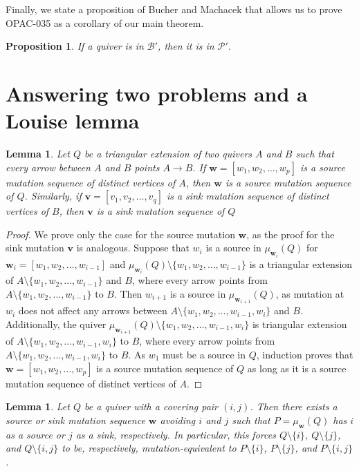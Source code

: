 \documentclass[10pt]{amsart}
\newtheorem{lemm}[thm]{Lemma}
\newtheorem{prop}[thm]{Proposition}
\theoremstyle{definition}
\theoremstyle{remark}
\newcommand{\BB}{\mathcal{B}}
\newcommand{\PP}{\mathcal{P}}
\newcommand{\bw}{{\boldsymbol{w}}}
\newcommand{\bv}{{\boldsymbol{v}}}
\begin{document}
Finally, we state a proposition of Bucher and Machacek that allows us to prove OPAC-035 as a corollary of our main theorem.

\begin{prop}{\cite[Proposition 3.4]{MR4108215}} \label{prop-banff-p-containment}
    If a quiver is in $\BB'$, then it is in $\PP'$.
\end{prop}

\section{Answering two problems and a Louise lemma}\label{sec-proof}

\begin{lemm} \label{lem-triangular-extension-source-sink}
    Let $Q$ be a triangular extension of two quivers $A$ and $B$ such that every arrow between $A$ and $B$ points $A \to B$.
    If $\bw = [w_1, w_2, \dots, w_p]$ is a source mutation sequence of distinct vertices of $A$, then $\bw$ is a source mutation sequence of $Q$.
    Similarly, if $\bv = [v_1, v_2, \dots, v_q]$ is a sink mutation sequence of distinct vertices of $B$, then $\bv$ is a sink mutation sequence of $Q$
\end{lemm}

\begin{proof}
    We prove only the case for the source mutation $\bw$, as the proof for the sink mutation $\bv$ is analogous. 
    Suppose that $w_i$ is a source in $\mu_{\bw_i}(Q)$ for $\bw_i = [w_1, w_2, \dots, w_{i-1}]$ and $\mu_{\bw_i}(Q) \setminus \{w_1,w_2,\dots, w_{i-1}\}$ is a triangular extension of $A \setminus \{w_1,w_2,\dots, w_{i-1}\}$ and $B$, where every arrow points from $A \setminus \{w_1,w_2,\dots, w_{i-1}\}$ to $B$.
    Then $w_{i+1}$ is a source in $\mu_{\bw_{i+1}}(Q)$, as mutation at $w_i$ does not affect any arrows between $A \setminus \{w_1,w_2,\dots, w_{i-1}, w_i\}$ and $B$.
    Additionally, the quiver $\mu_{\bw_{i+1}}(Q) \setminus \{w_1,w_2,\dots, w_{i-1}, w_i\}$ is triangular extension of $A \setminus \{w_1,w_2,\dots, w_{i-1}, w_i\}$ to $B$, where every arrow points from $A \setminus \{w_1,w_2,\dots, w_{i-1}, w_i\}$ to $B$.
    As $w_1$ must be a source in $Q$, induction proves that $\bw = [w_1, w_2, \dots, w_p]$ is a source mutation sequence of $Q$ as long as it is a source mutation sequence of distinct vertices of $A$.
\end{proof}

\begin{lemm} \label{lem-covering-pair-mutation}
    Let $Q$ be a quiver with a covering pair $(i,j)$.
    Then there exists a source or sink mutation sequence $\bw$ avoiding $i$ and $j$ such that $P = \mu_\bw(Q)$ has $i$ as a source or $j$ as a sink, respectively.
    In particular, this forces $Q \setminus \{i\}$, $Q \setminus \{j\}$, and $Q \setminus \{i,j\}$ to be, respectively, mutation-equivalent to $P \setminus \{i\}$, $P \setminus \{j\}$, and $P \setminus \{i,j\}$.
\end{lemm}
\end{document}
